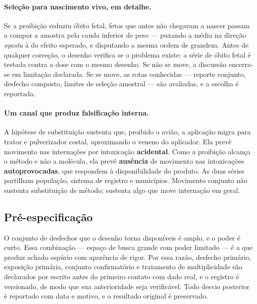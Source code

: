 \paragraph{Seleção para nascimento vivo, em detalhe.} Se a proibição reduziu
óbito fetal, fetos que antes não chegavam a nascer passam a compor a amostra pela
cauda inferior de peso --- puxando a média na direção \emph{oposta} à do efeito
esperado, e disputando a mesma ordem de grandeza. Antes de qualquer correção, o
desenho verifica se o problema existe: a série de óbito fetal é testada contra a
dose com o mesmo desenho. Se não se move, a discussão encerra-se em limitação
declarada. Se se move, as rotas conhecidas --- reporte conjunto, desfecho
composto, limites de seleção amostral --- são avaliadas, e a escolha é reportada.

\paragraph{Um canal que produz falsificação interna.} A hipótese de substituição
sustenta que, proibido o avião, a aplicação migra para trator e pulverizador
costal, aproximando o veneno do aplicador. Ela prevê movimento nas internações
por intoxicação \textbf{acidental}. Como a proibição alcança o método e não a
molécula, ela prevê \textbf{ausência} de movimento nas intoxicações
\textbf{autoprovocadas}, que respondem à disponibilidade do produto. As duas
séries partilham população, sistema de registro e municípios. Movimento conjunto
não sustenta substituição de método; sustenta algo que move internação em geral.

\subsection{Pré-especificação}
\label{sub:prespec}

O conjunto de desfechos que o desenho torna disponíveis é amplo, e o poder é
curto. Essa combinação --- espaço de busca grande com poder limitado --- é a que
produz achado espúrio com aparência de rigor. Por essa razão, desfecho primário,
exposição primária, conjunto confirmatório e tratamento de multiplicidade são
declarados por escrito antes do primeiro contato com dado real, e o registro é
versionado, de modo que sua anterioridade seja verificável. Todo desvio posterior
é reportado com data e motivo, e o resultado original é preservado.
